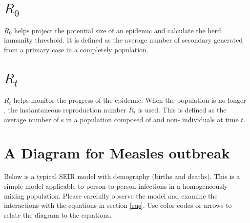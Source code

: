 \documentclass{article}
\begin{document}
\section{\( R_0 \)}
\( R_0 \) helps project the potential
size of an epidemic and calculate the herd immunity threshold.
It is defined as the average number of secondary \underline{\hspace{2cm}} generated from a primary case in a completely
\underline{\hspace{3cm}} population.

\section{\( R_t \)}
\( R_t \)
helps monitor the progress of the epidemic.
When the population is no longer \underline{\hspace{2cm}}, the instantaneous
reproduction number \( R_t \) is used. This is defined as the average number
of s\underline{\hspace{2cm}} in a population composed of
\underline{\hspace{2cm}} and non-\underline{\hspace{2cm}} individuals at time \( t \).

\section{A Diagram for Measles outbreak}

Below is a typical SEIR model with demography (births and deaths). This is a simple
model applicable to person-to-person infections in a homogeneously mixing population.
Please carefully observe the model and examine the interactions with the equations
in section \ref{eqs}.  Use color codes or arrows to relate the diagram to the equations.


\begin{center}
\end{center}
\end{document}

